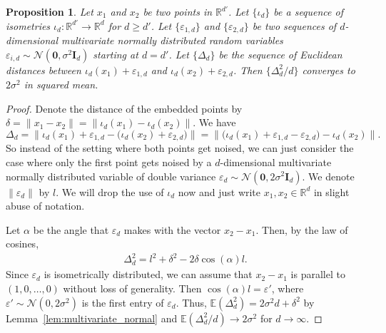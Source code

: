 \documentclass{article}
\theoremstyle{plain}
\newtheorem{proposition}[theorem]{Proposition}
\theoremstyle{definition}
\theoremstyle{remark}
\begin{document}
\begin{proposition}\label{prop:pyth}
    Let $x_1$ and $x_2$ be two points in $\mathbb{R}^{d'}$. Let $\{\iota_d\}$ be a sequence of isometries \mbox{$\iota_d: \mathbb{R}^{d'} \to \mathbb{R}^{d}$} for $d\geq d'$. Let $\{\varepsilon_{1,d}\}$ and $\{\varepsilon_{2,d}\}$ be two sequences of $d$-dimensional multivariate normally distributed random variables $\varepsilon_{i, d} \sim \mathcal{N}(\mathbf{0}, \sigma^2\mathbf{I}_d)$ starting at $d=d'$. Let $\{\Delta_d\}$ be the sequence of Euclidean distances between $\iota_d(x_1)+\varepsilon_{1,d}$ and $\iota_d(x_2) + \varepsilon_{2,d}$. Then $\{\Delta_d^2 / d\}$ converges to $2\sigma^2$ in squared mean.
\end{proposition}
\begin{proof}
    Denote the distance of the embedded points by $\delta = \|x_1 -x_2\| = \|\iota_d(x_1)-\iota_d(x_2)\|$. We have 
    $$\Delta_d = \| \iota_d(x_1) + \varepsilon_{1,d} - \big(\iota_d(x_2) + \varepsilon_{2,d}\big)\| = \| \big(\iota_d(x_1)+ \varepsilon_{1,d}-  \varepsilon_{2,d}\big) - \iota_d(x_2)\|.$$
    So instead of the setting where both points get noised, we can just consider the case where only the first point gets noised by a $d$-dimensional multivariate normally distributed variable of double variance $\varepsilon_d \sim \mathcal{N}(\mathbf{0}, 2\sigma^2 \mathbf{I}_d)$. We denote $\|\varepsilon_d\|$ by $l$. We will drop the use of $\iota_d$ now and just write $x_1, x_2 \in \mathbb{R}^{d}$ in slight abuse of notation.
    
    Let $\alpha$ be the angle that $\varepsilon_d$ makes with the vector $x_2 -x_1$. Then, by the law of cosines, 
    \begin{align}
        \Delta_d^2 
        = l^2 + \delta^2 - 2\delta \cos(\alpha) l.
    \end{align}
    Since $\varepsilon_d$ is isometrically distributed, we can assume that $x_2 -x_1$ is parallel to $(1, 0, \dots, 0)$ without loss of generality. Then $\cos(\alpha)l = \varepsilon'$, where $\varepsilon'  \sim \mathcal{N}(0, 2\sigma^2)$ is the first entry of $\varepsilon_d$. Thus, $\mathbb{E}(\Delta_d^2) = 2\sigma^2 d + \delta^2$ by Lemma~\ref{lem:multivariate_normal} and $\mathbb{E}(\Delta_d^2 / d) \to 2\sigma^2$ for $d\to \infty$. 
    

\end{proof}
\end{document}

